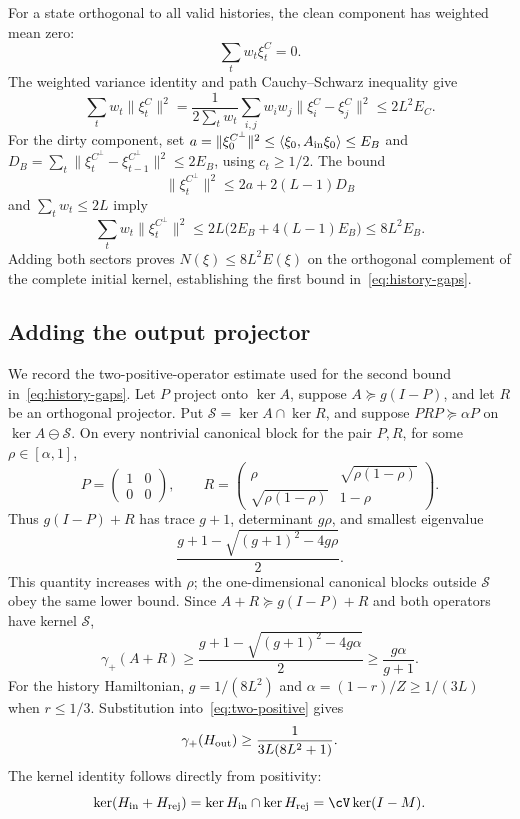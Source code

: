 For a state orthogonal to all valid histories, the clean component has weighted mean zero:
\[
\sum_tw_t\xi_t^C=0.
\]
The weighted variance identity and path Cauchy--Schwarz inequality give
\[
\sum_tw_t\|\xi_t^C\|^2
=\frac1{2\sum_tw_t}
\sum_{i,j}w_iw_j\|\xi_i^C-\xi_j^C\|^2
\le2L^2E_C.
\]
For the dirty component, set
\(a=\|\xi_0^{C^\perp}\|^2\le\langle\xi_0,A_{\rm in}\xi_0\rangle\le E_B\) and
\(
D_B=\sum_t\|\xi_t^{C^\perp}-\xi_{t-1}^{C^\perp}\|^2\le2E_B
\), using \(c_t\ge1/2\).
The bound
\[
\|\xi_t^{C^\perp}\|^2\le2a+2(L-1)D_B
\]
and \(\sum_tw_t\le2L\) imply
\[
\sum_tw_t\|\xi_t^{C^\perp}\|^2
\le2L\bigl(2E_B+4(L-1)E_B\bigr)\le8L^2E_B.
\]
Adding both sectors proves \(N(\xi)\le8L^2E(\xi)\) on the orthogonal complement of the complete initial kernel, establishing the first bound in~\cref{eq:history-gaps}.

\subsection{Adding the output projector}

We record the two-positive-operator estimate used for the second bound in~\cref{eq:history-gaps}. Let \(P\) project onto \(\ker A\), suppose
\(A\succeq g(I-P)\), and let \(R\) be an orthogonal projector.  Put
\(\mathcal S=\ker A\cap\ker R\), and suppose \(PRP\succeq\alpha P\) on
\(\ker A\ominus\mathcal S\).  On every nontrivial canonical block for the
pair \(P,R\), for some \(\rho\in[\alpha,1]\),
\[
 P=\begin{pmatrix}1&0\\0&0\end{pmatrix},\qquad
 R=\begin{pmatrix}
 \rho&\sqrt{\rho(1-\rho)}\\
 \sqrt{\rho(1-\rho)}&1-\rho
 \end{pmatrix}.
\]
Thus \(g(I-P)+R\) has trace \(g+1\), determinant \(g\rho\), and
smallest eigenvalue
\[
 \frac{g+1-\sqrt{(g+1)^2-4g\rho}}2.
\]
This quantity increases with \(\rho\); the one-dimensional canonical blocks
outside \(\mathcal S\) obey the same lower bound.  Since
\(A+R\succeq g(I-P)+R\) and both operators have kernel \(\mathcal S\),
\begin{equation}
\label{eq:two-positive}
\gamma_+(A+R)
\ge
\frac{g+1-\sqrt{(g+1)^2-4g\alpha}}2
\ge\frac{g\alpha}{g+1}.
\end{equation}
For the history Hamiltonian, \(g=1/(8L^2)\) and \(\alpha=(1-r)/Z\ge1/(3L)\) when \(r\le1/3\). Substitution into~\cref{eq:two-positive} gives
\[
\gamma_+(H_{\rm out})
\ge\frac1{3L(8L^2+1)}.
\]
The kernel identity follows directly from positivity:
\[
\ker(H_{\rm in}+H_{\rm rej})
=\ker H_{\rm in}\cap\ker H_{\rm rej}
=\cV\ker(I-M).
\]

